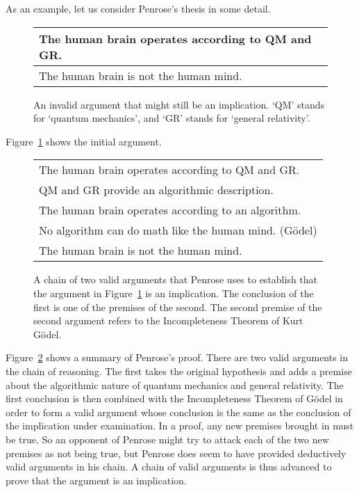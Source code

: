 As an example, let us consider Penrose's thesis in some detail.
\begin{figure}
   \begin{center}
      \begin{framed}
         \begin{tabular}{p{}}
            The human brain operates according to QM and GR.\\
            \midrule
            The human brain is not the human mind.
         \end{tabular}
      \end{framed}
   \end{center}
   \caption{An invalid argument that might still be an implication. `QM' stands
      for `quantum mechanics', and `GR' stands for `general relativity'.%
   }
\label{fig:brain}
\end{figure}
Figure~\ref{fig:brain} shows the initial argument.
\begin{figure}
   \begin{center}
      \begin{framed}
         \begin{tabular}{p{}}
            The human brain operates according to QM and GR.\\
            QM and GR provide an algorithmic description.\\
            \midrule
            The human brain operates according to an algorithm.\\
            No algorithm can do math like the human mind. (G\"odel)\\
            \midrule
            The human brain is not the human mind.
         \end{tabular}
      \end{framed}
   \end{center}
   \caption{A chain of two valid arguments that Penrose uses to establish that
      the argument in Figure~\ref{fig:brain} is an implication.  The conclusion
      of the first is one of the premises of the second.  The second premise of
      the second argument refers to the Incompleteness Theorem of Kurt
      G\"odel.%
   }
\label{fig:brain2}
\end{figure}
Figure~\ref{fig:brain2} shows a summary of Penrose's proof.  There are two
valid arguments in the chain of reasoning. The first takes the original
hypothesis and adds a premise about the algorithmic nature of quantum mechanics
and general relativity. The first conclusion is then combined with the
Incompleteness Theorem of G\"odel in order to form a valid argument whose
conclusion is the same as the conclusion of the implication under examination.
In a proof, any new premises brought in must be true.  So an opponent of
Penrose might try to attack each of the two new premises as not being true, but
Penrose does seem to have provided deductively valid arguments in his chain.  A
chain of valid arguments is thus advanced to prove that the argument is an
implication.

